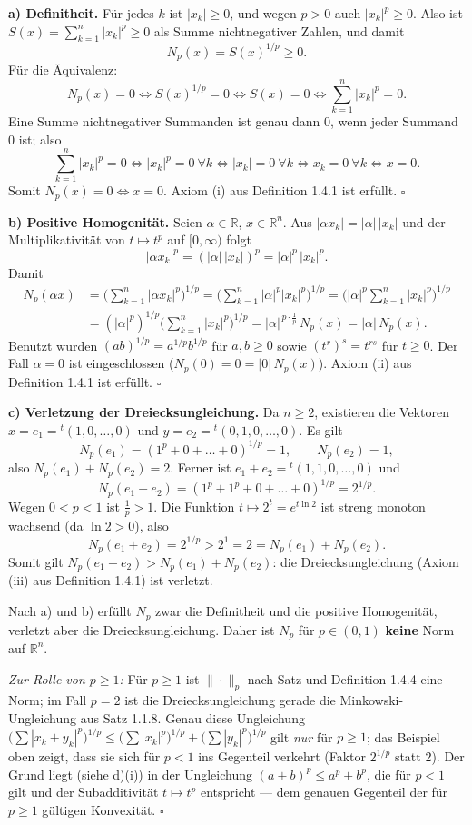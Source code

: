 \documentclass[a4paper,11pt]{article}
\begin{document}
\medskip
\textbf{a) Definitheit.}
Für jedes $k$ ist $|x_k|\ge 0$, und wegen $p>0$ auch $|x_k|^p\ge 0$. Also ist $S(x)=\sum_{k=1}^n|x_k|^p\ge 0$ als Summe nichtnegativer Zahlen, und damit
\[
N_p(x)=S(x)^{1/p}\ge 0 .
\]
Für die Äquivalenz:
\[
N_p(x)=0\iff S(x)^{1/p}=0\iff S(x)=0\iff \sum_{k=1}^n|x_k|^p=0 .
\]
Eine Summe nichtnegativer Summanden ist genau dann $0$, wenn jeder Summand $0$ ist; also
\[
\sum_{k=1}^n|x_k|^p=0\iff |x_k|^p=0\ \forall k\iff |x_k|=0\ \forall k\iff x_k=0\ \forall k\iff x=0 .
\]
Somit $N_p(x)=0\iff x=0$. Axiom (i) aus Definition 1.4.1 ist erfüllt. \hfill$\square$

\medskip
\textbf{b) Positive Homogenität.}
Seien $\alpha\in\mathbb{R}$, $x\in\mathbb{R}^n$. Aus $|\alpha x_k|=|\alpha|\,|x_k|$ und der Multiplikativität von $t\mapsto t^p$ auf $[0,\infty)$ folgt
\[
|\alpha x_k|^p=(|\alpha|\,|x_k|)^p=|\alpha|^p\,|x_k|^p .
\]
Damit
\begin{align*}
N_p(\alpha x)
&=\Big(\sum_{k=1}^n|\alpha x_k|^p\Big)^{1/p}
=\Big(\sum_{k=1}^n|\alpha|^p|x_k|^p\Big)^{1/p}
=\Big(|\alpha|^p\sum_{k=1}^n|x_k|^p\Big)^{1/p}\\[0.3em]
&=(|\alpha|^p)^{1/p}\Big(\sum_{k=1}^n|x_k|^p\Big)^{1/p}
=|\alpha|^{\,p\cdot\frac1p}\,N_p(x)
=|\alpha|\,N_p(x).
\end{align*}
Benutzt wurden $(ab)^{1/p}=a^{1/p}b^{1/p}$ für $a,b\ge 0$ sowie $(t^r)^s=t^{rs}$ für $t\ge 0$. Der Fall $\alpha=0$ ist eingeschlossen ($N_p(0)=0=|0|\,N_p(x)$). Axiom (ii) aus Definition 1.4.1 ist erfüllt. \hfill$\square$

\medskip
\textbf{c) Verletzung der Dreiecksungleichung.}
Da $n\ge 2$, existieren die Vektoren $x=e_1={}^t(1,0,\dots,0)$ und $y=e_2={}^t(0,1,0,\dots,0)$. Es gilt
\[
N_p(e_1)=(1^p+0+\dots+0)^{1/p}=1,\qquad N_p(e_2)=1,
\]
also $N_p(e_1)+N_p(e_2)=2$. Ferner ist $e_1+e_2={}^t(1,1,0,\dots,0)$ und
\[
N_p(e_1+e_2)=(1^p+1^p+0+\dots+0)^{1/p}=2^{1/p}.
\]
Wegen $0<p<1$ ist $\tfrac1p>1$. Die Funktion $t\mapsto 2^t=e^{t\ln 2}$ ist streng monoton wachsend (da $\ln 2>0$), also
\[
N_p(e_1+e_2)=2^{1/p}>2^{1}=2=N_p(e_1)+N_p(e_2).
\]
Somit gilt $N_p(e_1+e_2)>N_p(e_1)+N_p(e_2)$: die Dreiecksungleichung (Axiom (iii) aus Definition 1.4.1) ist verletzt.

Nach a) und b) erfüllt $N_p$ zwar die Definitheit und die positive Homogenität, verletzt aber die Dreiecksungleichung. Daher ist $N_p$ für $p\in(0,1)$ \textbf{keine} Norm auf $\mathbb{R}^n$.

\emph{Zur Rolle von $p\ge 1$:} Für $p\ge 1$ ist $\|\cdot\|_p$ nach Satz und Definition 1.4.4 eine Norm; im Fall $p=2$ ist die Dreiecksungleichung gerade die Minkowski-Ungleichung aus Satz 1.1.8. Genau diese Ungleichung
$\big(\sum|x_k+y_k|^p\big)^{1/p}\le\big(\sum|x_k|^p\big)^{1/p}+\big(\sum|y_k|^p\big)^{1/p}$
gilt \emph{nur} für $p\ge 1$; das Beispiel oben zeigt, dass sie sich für $p<1$ ins Gegenteil verkehrt (Faktor $2^{1/p}$ statt $2$). Der Grund liegt (siehe d)(i)) in der Ungleichung $(a+b)^p\le a^p+b^p$, die für $p<1$ gilt und der Subadditivität $t\mapsto t^p$ entspricht — dem genauen Gegenteil der für $p\ge 1$ gültigen Konvexität. \hfill$\square$
\end{document}
